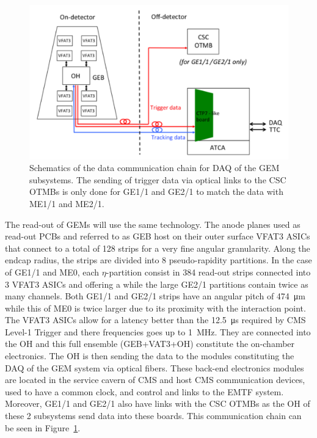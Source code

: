 	\begin{figure}[H]
		\centering
		\includegraphics[width=0.8\plotwidth]{fig/chapt3/GEM-electronics.png}
		\caption{\label{fig:GEM-electronics} Schematics of the data communication chain for DAQ of the GEM subsystems. The sending of trigger data via optical links to the CSC OTMBs is only done for GE1/1 and GE2/1 to match the data with ME1/1 and ME2/1.}
	\end{figure}
	
	The read-out of GEMs will use the same technology. The anode planes used as read-out PCBs and referred to as \acf{GEB} host on their outer surface VFAT3 ASICs that connect to a total of 128 strips for a very fine angular granularity. Along the endcap radius, the strips are divided into 8 pseudo-rapidity partitions. In the case of GE1/1 and ME0, each $\eta$-partition consist in 384 read-out strips connected into 3 VFAT3 ASICs and offering a while the large GE2/1 partitions contain twice as many channels. Both GE1/1 and GE2/1 strips have an angular pitch of \SI{474}{\micro m} while this of ME0 is twice larger due to its proximity with the interaction point. The VFAT3 ASICs allow for a latency better than the \SI{12.5}{\micro s} required by CMS Level-1 Trigger and there frequencies goes up to \SI{1}{MHz}. They are connected into the \acf{OH} and this full ensemble (GEB+VAT3+OH) constitute the on-chamber electronics. The OH is then sending the data to the modules constituting the DAQ of the GEM system via optical fibers. These back-end electronics modules are located in the service cavern of CMS and host CMS communication devices, used to have a common clock, and control and links to the \acf{EMTF} system. Moreover, GE1/1 and GE2/1 also have links with the CSC OTMBs as the OH of these 2 subsystems send data into these boards. This communication chain can be seen in Figure~\ref{fig:GEM-electronics}.\\
	
